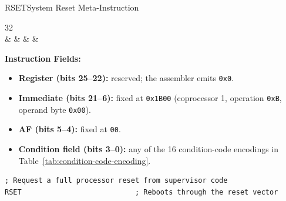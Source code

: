 \begin{instructionbox}{RSET}{System Reset Meta-Instruction}
	\begin{center}
		\begin{bytefield}[bitwidth=1.1em]{32}
			 \\
			 &
			 &
			 &
			 &
		\end{bytefield}
	\end{center}

	\textbf{Instruction Fields:}
	\begin{itemize}
		\item \textbf{Register (bits 25--22):} reserved; the assembler emits \texttt{0x0}.
		\item \textbf{Immediate (bits 21--6):} fixed at \texttt{0x1B00} (coprocessor 1, operation \texttt{0xB},
		      operand byte \texttt{0x00}).
		\item \textbf{AF (bits 5--4):} fixed at \texttt{00}.
		\item \textbf{Condition field (bits 3--0):} any of the 16 condition-code encodings in
		      Table~\ref{tab:condition-code-encoding}.
	\end{itemize}

	\begin{example}
		\begin{lstlisting}
; Request a full processor reset from supervisor code
RSET                           ; Reboots through the reset vector
		\end{lstlisting}
		\caption{Requesting a Software Reset}
	\end{example}
\end{instructionbox}

